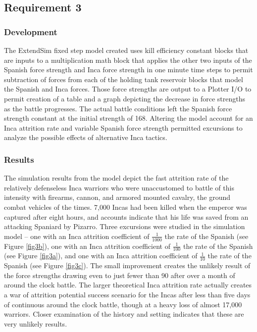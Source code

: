 \documentclass[letterpaper,10pt]{article}
\begin{document}
\subsection{Requirement 3}
\subsubsection{Development}
The ExtendSim fixed step model created uses kill efficiency constant blocks that are inputs to a multiplication math block that applies the other two inputs of the Spanish force strength and Inca force strength in one minute time steps to permit subtraction of forces from each of the holding tank reservoir blocks that model the Spanish and Inca forces.  Those force strengths are output to a Plotter I/O to permit creation of a table and a graph depicting the decrease in force strengths as the battle progresses.  The actual battle conditions left the Spanish force strength constant at the initial strength of 168.  Altering the model account for an Inca attrition rate and variable Spanish force strength permitted excursions to analyze the possible effects of alternative Inca tactics.

\subsubsection{Results}
The simulation results from the model depict the fast attrition rate of the relatively defenseless Inca warriors who were unaccustomed to battle of this intensity with firearms, cannon, and armored mounted cavalry, the ground combat vehicles of the times.  7,000 Incas had been killed when the emperor was captured after eight hours, and accounts indicate that his life was saved from an attacking Spaniard by Pizarro.  Three excursions were studied in the simulation model – one with an Inca attrition coefficient of $\frac{1}{1000}$ the rate of the Spanish (see Figure \ref{fig3b}), one with an Inca attrition coefficient of $\frac{1}{100}$ the rate of the Spanish (see Figure \ref{fig3a}), and one with an Inca attrition coefficient of $\frac{1}{10}$ the rate of the Spanish (see Figure \ref{fig3c}).  The small improvement creates the unlikely result of the force strengths drawing even to just fewer than 90 after over a month of around the clock battle.  The larger theoretical Inca attrition rate actually creates a war of attrition potential success scenario for the Incas after less than five days of continuous around the clock battle, though at a heavy loss of almost 17,000 warriors.  Closer examination of the history and setting indicates that these are very unlikely results.
\end{document}
